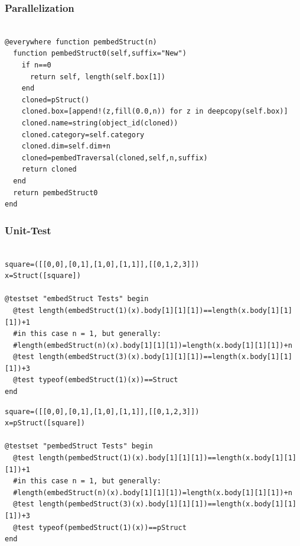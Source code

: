 \documentclass[a4paper,12pt]{article}
\begin{document}
\subsubsection{Parallelization}
\begin{Verbatim}[fontsize=\footnotesize]

@everywhere function pembedStruct(n)
  function pembedStruct0(self,suffix="New")
    if n==0
      return self, length(self.box[1])
    end
    cloned=pStruct()
    cloned.box=[append!(z,fill(0.0,n)) for z in deepcopy(self.box)]
    cloned.name=string(object_id(cloned))
    cloned.category=self.category
    cloned.dim=self.dim+n
    cloned=pembedTraversal(cloned,self,n,suffix)
    return cloned
  end
  return pembedStruct0
end

\end{Verbatim}

\subsubsection{Unit-Test}

\noindent{}
\begin{Verbatim}[fontsize=\footnotesize]

square=([[0,0],[0,1],[1,0],[1,1]],[[0,1,2,3]])
x=Struct([square])	

@testset "embedStruct Tests" begin
  @test length(embedStruct(1)(x).body[1][1][1])==length(x.body[1][1][1])+1
  #in this case n = 1, but generally: 
  #length(embedStruct(n)(x).body[1][1][1])=length(x.body[1][1][1])+n
  @test length(embedStruct(3)(x).body[1][1][1])==length(x.body[1][1][1])+3
  @test typeof(embedStruct(1)(x))==Struct	
end

\end{Verbatim}

\noindent{}
\begin{Verbatim}[fontsize=\footnotesize]
square=([[0,0],[0,1],[1,0],[1,1]],[[0,1,2,3]])
x=pStruct([square])

@testset "pembedStruct Tests" begin
  @test length(pembedStruct(1)(x).body[1][1][1])==length(x.body[1][1][1])+1 
  #in this case n = 1, but generally: 
  #length(embedStruct(n)(x).body[1][1][1])=length(x.body[1][1][1])+n
  @test length(pembedStruct(3)(x).body[1][1][1])==length(x.body[1][1][1])+3
  @test typeof(pembedStruct(1)(x))==pStruct	
end
\end{Verbatim}
\end{document}
